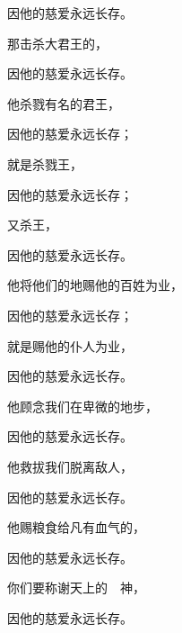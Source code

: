 {\par }{\Q 因他的慈爱永远长存。
\par }{\Q {}那击杀大君王的，
\par }{\Q 因他的慈爱永远长存。
\par }{\Q {}他杀戮有名的君王，
\par }{\Q 因他的慈爱永远长存；
\par }{\Q {}就是杀戮{}王{}，
\par }{\Q 因他的慈爱永远长存；
\par }{\Q {}又杀{}王{}，
\par }{\Q 因他的慈爱永远长存。
\par }{\Q {}他将他们的地赐他的百姓为业，
\par }{\Q 因他的慈爱永远长存；
\par }{\Q {}就是赐他的仆人{}为业，
\par }{\Q 因他的慈爱永远长存。
\par }{\BB \par }{\Q {}他顾念我们在卑微的地步，
\par }{\Q 因他的慈爱永远长存。
\par }{\Q {}他救拔我们脱离敌人，
\par }{\Q 因他的慈爱永远长存。
\par }{\Q {}他赐粮食给凡有血气的，
\par }{\Q 因他的慈爱永远长存。
\par }{\BB \par }{\Q {}你们要称谢天上的　神，
\par }{\Q 因他的慈爱永远长存。

}
